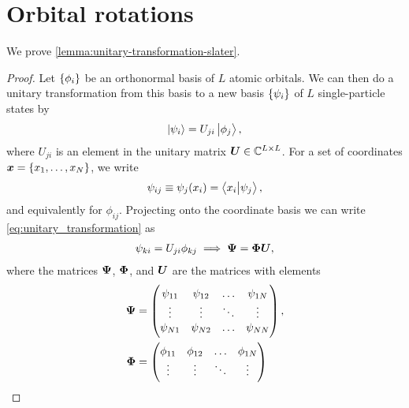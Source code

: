     \section{Orbital rotations}
        \label{sec:orbital-rotations}
        We prove \autoref{lemma:unitary-transformation-slater}.
        \begin{proof}
            Let $\left\{ \phi_i \right\}$ be an orthonormal basis of $L$
            atomic orbitals.
            We can then do a unitary transformation from this basis to a new
            basis $\left\{ \psi_i \right\}$ of $L$ single-particle states by
            \begin{align}
                \ket{\psi_i} = U_{ji}\ket{\phi_j},
                \label{eq:unitary_transformation}
            \end{align}
            where $U_{ji}$ is an element in the unitary matrix $\boldsymbol{U} \in
            \mathbb{C}^{L \times L}$.
            For a set of coordinates $\boldsymbol{x} = \left\{ x_1, \dots, x_N \right\}$, we
            write
            \begin{align}
                \psi_{ij} \equiv \psi_j(x_i)
                = \braket{x_i}{\psi_j},
            \end{align}
            and equivalently for $\phi_{ij}$. Projecting onto the coordinate
            basis we can write \autoref{eq:unitary_transformation} as
            \begin{gather}
                \psi_{ki} = U_{ji}\phi_{kj}
                \implies
                \boldsymbol{\Psi} = \boldsymbol{\Phi}\boldsymbol{U},
            \end{gather}
            where the matrices $\boldsymbol{\Psi}$, $\boldsymbol{\Phi}$, and $\boldsymbol{U}$ are
            the matrices with elements
            \begin{align}
                \boldsymbol{\Psi}
                &= \begin{pmatrix}
                    \psi_{11} & \psi_{12} & \dots & \psi_{1N} \\
                    \vdots & \vdots & \ddots & \vdots \\
                    \psi_{N1} & \psi_{N2} & \dots & \psi_{NN}
                \end{pmatrix}, \\
                \boldsymbol{\Phi}
                &= \begin{pmatrix}
                    \phi_{11} & \phi_{12} & \dots & \phi_{1N} \\
                    \vdots & \vdots & \ddots & \vdots \\

\end{pmatrix}
\end{align}
\end{proof}
